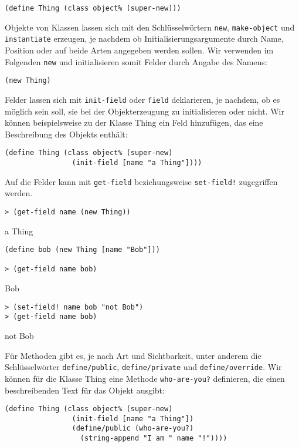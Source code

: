 \begin{lstlisting}
(define Thing (class object% (super-new)))
\end{lstlisting}

Objekte von Klassen lassen sich mit den Schlüsselwörtern \texttt{new}, \texttt{make-object} und \texttt{instantiate} erzeugen, je nachdem ob Initialisierungsargumente durch Name, Position oder auf beide Arten angegeben werden sollen. Wir verwenden im Folgenden \texttt{new} und initialisieren somit Felder durch Angabe des Namens:

\begin{lstlisting}
(new Thing)
\end{lstlisting}

Felder lassen sich mit \texttt{init-field} oder \texttt{field} deklarieren, je nachdem, ob es möglich sein soll, sie bei der Objekterzeugung zu initialisieren oder nicht. Wir können beispielsweise zu der Klasse Thing ein Feld hinzufügen, das eine Beschreibung des Objekts enthält:

\begin{lstlisting}
(define Thing (class object% (super-new)
                (init-field [name "a Thing"])))
\end{lstlisting}

Auf die Felder kann mit \texttt{get-field} beziehungsweise \texttt{set-field!} zugegriffen werden. 

\begin{lstlisting}
> (get-field name (new Thing))
\end{lstlisting}
{\routput {\qq}a Thing{\qq}}

\begin{lstlisting}
(define bob (new Thing [name "Bob"]))

> (get-field name bob)
\end{lstlisting}
{\routput {\qq}Bob{\qq}}

\begin{lstlisting}
> (set-field! name bob "not Bob")
> (get-field name bob)
\end{lstlisting}
{\routput {\qq}not Bob{\qq}}

Für Methoden gibt es, je nach Art und Sichtbarkeit, unter anderem die Schlüsselwörter \texttt{define/public}, \texttt{define/private} und \texttt{define/override}. Wir können für die Klasse Thing eine Methode \texttt{who-are-you?} definieren, die einen beschreibenden Text für das Objekt ausgibt:

\begin{lstlisting}
(define Thing (class object% (super-new)
                (init-field [name "a Thing"])
                (define/public (who-are-you?) 
                  (string-append "I am " name "!"))))
\end{lstlisting}

